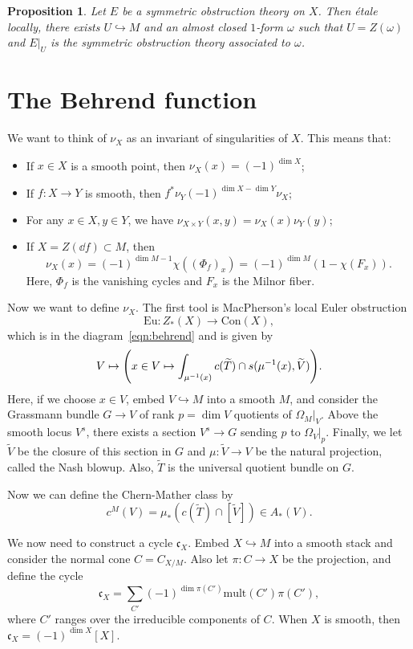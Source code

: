 \documentclass[leqno, openany]{memoir}
\newtheorem{prop}[thm]{Proposition}
\theoremstyle{definition}
\theoremstyle{remark}
\theoremstyle{plain}
\theoremstyle{definition}
\theoremstyle{remark}
\newcommand{\mf}[1]{\mathfrak{#1}}
\newcommand{\mr}[1]{\mathrm{#1}}
\newcommand{\wt}[1]{\widetilde{#1}}
\begin{document}
\begin{prop}
    Let $E$ be a symmetric obstruction theory on $X$. Then \'etale locally, there exists $U \hookrightarrow M$ and an almost closed $1$-form $\omega$ such that $U = Z(\omega)$ and $E|_U$ is the symmetric obstruction theory associated to $\omega$.
\end{prop}

\section{The Behrend function}

We want to think of $\nu_X$ as an invariant of singularities of $X$. This means that:
\begin{itemize}
    \item If $x \in X$ is a smooth point, then $\nu_X(x) = (-1)^{\dim X}$;
    \item If $f \colon X \to Y$ is smooth, then $f^* \nu_Y (-1)^{\dim X - \dim Y} \nu_X$;
    \item For any $x \in X, y \in Y$, we have $\nu_{X \times Y}(x,y) = \nu_X(x) \nu_Y(y)$;
    \item If $X = Z(\dd{f}) \subset M$, then 
        \[ \nu_X(x) = (-1)^{\dim M - 1} \chi ((\Phi_f)_x) = (-1)^{\dim M} (1-\chi(F_x)). \]
        Here, $\Phi_f$ is the vanishing cycles and $F_x$ is the Milnor fiber.
\end{itemize}

Now we want to define $\nu_X$. The first tool is MacPherson's local Euler obstruction
\[ \mr{Eu} \colon Z_*(X) \to \mr{Con}(X), \]
which is in the diagram~\ref{eqn:behrend} and is given by
\[ V \mapsto \qty(x \in V \mapsto \int_{\mu^{-1}(x)} c(\wt{T}) \cap s(\mu^{-1}(x), \wt{V})). \]
Here, if we choose $x \in V$, embed $V \hookrightarrow M$ into a smooth $M$, and consider the Grassmann bundle $G \to V$ of rank $p = \dim V$ quotients of $\Omega_M |_V$. Above the smooth locus $V^s$, there exists a section $V^s \to G$ sending $p$ to $\Omega_V |_p$. Finally, we let $\wt{V}$ be the closure of this section in $G$ and $\mu \colon \wt{V} \to V$ be the natural projection, called the Nash blowup. Also, $\wt{T}$ is the universal quotient bundle on $G$.

Now we can define the Chern-Mather class by
\[ c^M(V) = \mu_* (c(\wt{T}) \cap [\wt{V}]) \in A_*(V). \]

We now need to construct a cycle $\mf{c}_X$. Embed $X \hookrightarrow M$ into a smooth stack and consider the normal cone $C = C_{X/M}$. Also let $\pi \colon C \to X$ be the projection, and define the cycle
\[ \mf{c}_X = \sum_{C'} (-1)^{\dim \pi(C')} \mr{mult}(C') \pi(C'), \]
where $C'$ ranges over the irreducible components of $C$. When $X$ is smooth, then $\mf{c}_X = (-1)^{\dim X} [X]$.
\end{document}
